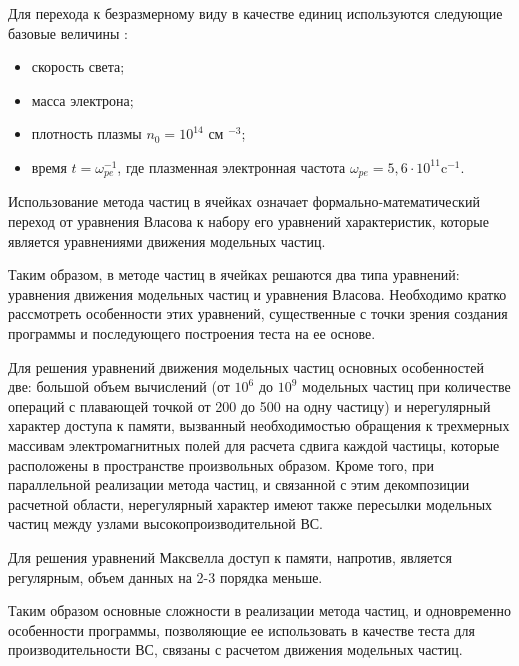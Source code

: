 Для перехода к безразмерному виду в качестве единиц
используются следующие базовые величины \cite{VychMetPlasma}:
\begin{itemize}
	\item скорость света;
	\item масса электрона;
	\item плотность плазмы $n_0=10^{14}$ см $^{-3}$;
	\item время $t=\omega _{pe}^{-1}$, где плазменная электронная частота $\omega_{pe} =5,6 \cdot 10^{11}$c$^{-1}$.
\end{itemize}

Использование метода частиц в ячейках означает формально-математический переход от уравнения Власова к набору его уравнений характеристик, которые является уравнениями движения модельных частиц.

Таким образом, в методе частиц в ячейках решаются два типа уравнений: уравнения движения модельных частиц и уравнения Власова. Необходимо кратко рассмотреть особенности этих уравнений, существенные с точки зрения создания программы и последующего построения теста на ее основе.

Для решения уравнений движения модельных частиц основных особенностей две: большой объем вычислений (от $10^6$ до $10^9$
модельных частиц при количестве операций с плавающей точкой от 200 до 500 на одну частицу) и нерегулярный характер доступа к памяти, вызванный необходимостью обращения к трехмерных массивам электромагнитных полей для расчета сдвига каждой частицы, которые расположены в пространстве произвольных образом. Кроме того, при параллельной реализации метода частиц, и связанной с этим декомпозиции расчетной области, нерегулярный характер имеют также пересылки модельных частиц между узлами высокопроизводительной ВС.

Для решения уравнений Максвелла доступ к памяти, напротив, является регулярным, объем данных на 2-3 порядка меньше. 


Таким образом основные сложности в реализации метода частиц, и одновременно особенности программы, позволяющие ее использовать в качестве теста для производительности ВС, связаны с расчетом движения модельных частиц.%

